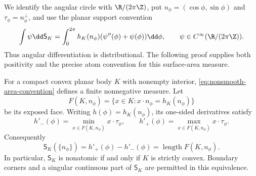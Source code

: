 We identify the angular circle with $\R/(2\pi\Z)$, put
$n_\phi=(\cos\phi,\sin\phi)$ and
$\tau_\phi=n_\phi^\perp$, and use the planar support convention
\begin{equation}\label{eq:nonsmooth-area-convention}
 \int\psi\dd\mathsf S_K
     =\int_0^{2\pi}h_K(n_\phi)
                      (\psi''(\phi)+\psi(\phi))\dd\phi,
 \qquad \psi\in C^\infty(\R/(2\pi\Z)).
\end{equation}
Thus angular differentiation is distributional.  The following
proof supplies both positivity and the precise atom convention
for this surface-area measure.

\begin{lemma}
\label{lem:nonsmooth-surface-atoms}
For a compact convex planar body $K$ with nonempty interior,
\eqref{eq:nonsmooth-area-convention} defines a finite nonnegative
measure.  Let
\[
 F(K,n_\phi)=\{x\in K:x\cdot n_\phi=h_K(n_\phi)\}
\]
be its exposed face.  Writing $h(\phi)=h_K(n_\phi)$, its
one-sided derivatives satisfy
\begin{equation}\label{eq:nonsmooth-face-derivatives}
 h'_-(\phi)=\min_{x\in F(K,n_\phi)}x\cdot\tau_\phi,
 \qquad
 h'_+(\phi)=\max_{x\in F(K,n_\phi)}x\cdot\tau_\phi.
\end{equation}
Consequently
\begin{equation}\label{eq:nonsmooth-atom-face-length}
 \mathsf S_K(\{n_\phi\})
       =h'_+(\phi)-h'_-(\phi)
       =\operatorname{length}F(K,n_\phi).
\end{equation}
In particular, $\mathsf S_K$ is nonatomic if and only if $K$ is
strictly convex.  Boundary corners and a singular continuous
part of $\mathsf S_K$ are permitted in this equivalence.
\end{lemma}
